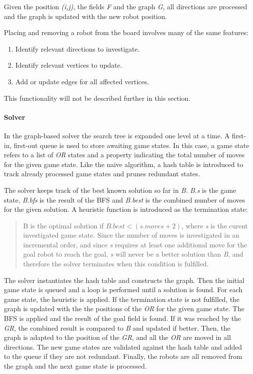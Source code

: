 \documentclass[]{article}
\providecommand{\tightlist}{%
  \setlength{\itemsep}{0pt}\setlength{\parskip}{0pt}}
\let\oldparagraph\paragraph
\renewcommand{\paragraph}[1]{\oldparagraph{#1}\mbox{}}
\begin{document}
Given the position \emph{(i,j)}, the fields \emph{F} and the graph
\emph{G}, all directions are processed and the graph is updated with the
new robot position.

Placing and removing a robot from the board involves many of the same
features:

\begin{enumerate}
\def\labelenumi{\arabic{enumi}.}
\tightlist
\item
  Identify relevant directions to investigate.
\item
  Identify relevant vertices to update.
\item
  Add or update edges for all affected vertices.
\end{enumerate}

This functionality will not be described further in this section.

\paragraph{Solver}\label{solver}

In the graph-based solver the search tree is expanded one level at a
time. A first-in, first-out queue is used to store awaiting game states.
In this case, a game state refers to a list of \emph{OR} states and a
property indicating the total number of moves for the given game state.
Like the naive algorithm, a hash table is introduced to track already
processed game states and prunes redundant states.

The solver keeps track of the best known solution so far in \emph{B}.
\emph{B.s} is the game state, \emph{B.bfs} is the result of the BFS and
\emph{B.best} is the combined number of moves for the given solution. A
heuristic function is introduced as the termination state:

\begin{quote}
B is the optimal solution if \(B.best < (s.moves + 2)\), where \emph{s}
is the curent investigated game state. Since the number of moves is
investigated in an incremental order, and since \emph{s} requires at
least one additional move for the goal robot to reach the goal, \emph{s}
will never be a better solution than \emph{B}, and therefore the solver
terminates when this condition is fulfilled.
\end{quote}

The solver instantiates the hash table and constructs the graph. Then
the initial game state is queued and a loop is performed until a
solution is found. For each game state, the heuristic is applied. If the
termination state is not fulfilled, the graph is updated with the the
positions of the \emph{OR} for the given game state. The BFS is applied
and the result of the goal field is found. If it was reached by the
\emph{GR}, the combined result is compared to \emph{B} and updated if
better. Then, the graph is adapted to the position of the \emph{GR}, and
all the \emph{OR} are moved in all directions. The new game states are
validated against the hash table and added to the queue if they are not
redundant. Finally, the robots are all removed from the graph and the
next game state is processed.
\end{document}
